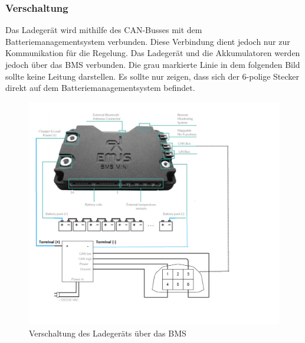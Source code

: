 \subsubsection{Verschaltung}
Das Ladegerät wird mithilfe des CAN-Busses mit dem Batteriemanagementsystem verbunden. Diese Verbindung dient jedoch nur zur Kommunikation für die Regelung. Das Ladegerät und die Akkumulatoren werden jedoch über das BMS verbunden. Die grau markierte Linie in dem folgenden Bild sollte keine Leitung darstellen. Es sollte nur zeigen, dass sich der 6-polige Stecker direkt auf dem Batteriemanagementsystem befindet.

\begin{figure}[H]
	\begin{center}
		\includegraphics[scale=0.6]{figures/Akku/VerschaltungCharger.png}
		\caption{Verschaltung des Ladegeräts über das BMS \cite{LadegerätBMS}}
		\label{fig: Verschaltung des Ladegeräts über das BMS}
	\end{center}
\end{figure}


